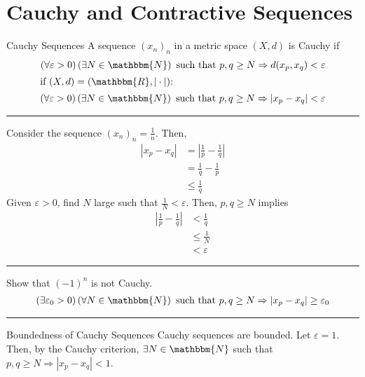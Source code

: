 \documentclass[10pt]{extarticle}
\newcommand{\N}{\mathbbm{N}}
\newcommand{\R}{\mathbbm{R}}
\begin{document}
  \section*{Cauchy and Contractive Sequences}%
  \begin{problem}{Cauchy Sequences}
    A sequence $(x_n)_n$ in a metric space $(X,d)$ is Cauchy if 
    \begin{align*}
      \left(\forall \varepsilon > 0\right)\left(\exists N\in\N\right) \text{ such that } p,q\geq N \Rightarrow d(x_p,x_q) < \varepsilon\\
      \shortintertext{if $(X,d) = (\R,|\cdot|)$:}
      \left(\forall \varepsilon > 0\right)\left(\exists N\in\N\right) \text{ such that } p,q\geq N \Rightarrow |x_p-x_q| < \varepsilon
    \end{align*}
    \vspace{4pt}
    \rule{\textwidth}{0.4pt}
    \vspace{4pt}
    Consider the sequence $(x_n)_n = \frac{1}{n}$. Then,
    \begin{align*}
      |x_p - x_q| &= \left|\frac{1}{p}-\frac{1}{q}\right|\\
                  &= \frac{1}{q}-\frac{1}{p}\\
                  &\leq \frac{1}{q}
    \end{align*}
    Given $\varepsilon > 0$, find $N$ large such that $\frac{1}{N}< \varepsilon$. Then, $p,q\geq N$ implies
    \begin{align*}
      \left|\frac{1}{p}-\frac{1}{q}\right|& < \frac{1}{q}\\
                                          &\leq \frac{1}{N}\\
                                          &< \varepsilon
    \end{align*}
    \vspace{4pt}
    \rule{\textwidth}{0.4pt}
    \vspace{4pt}
    Show that $(-1)^n$ is not Cauchy.
    \begin{align*}
      \left(\exists \varepsilon_0 > 0\right)\left(\forall N\in\N\right) \text{ such that } p,q\geq N \Rightarrow |x_p - x_q| \geq \varepsilon_0
    \end{align*}
    \vspace{4pt}
    \rule{\textwidth}{0.4pt}
    \vspace{4pt}
    \begin{problem}{Boundedness of Cauchy Sequences}
      Cauchy sequences are bounded.
      \tcblower
      Let $\varepsilon = 1$. Then, by the Cauchy criterion, $\exists N\in\N$ such that $p,q\geq N \Rightarrow |x_p-x_q| < 1$.\\


\end{problem}
\end{problem}
\end{document}
